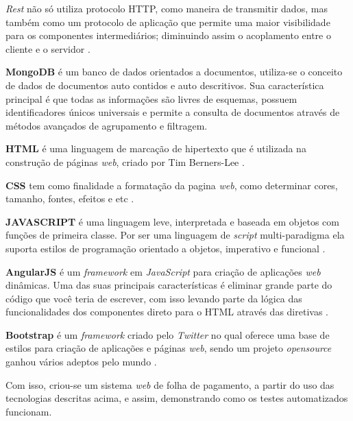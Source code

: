 \par \textit{Rest} não só utiliza protocolo HTTP, como maneira de transmitir dados, mas também como um protocolo de aplicação que permite uma maior visibilidade para os componentes intermediários; diminuindo assim o acoplamento entre o cliente e o servidor \cite{rest2}.







\textbf{MongoDB} é um banco de dados orientados a documentos, utiliza-se o conceito de dados de documentos auto contidos e auto descritivos. Sua característica principal é que todas as informações são livres de esquemas, possuem identificadores únicos universais e permite a consulta de documentos através de métodos avançados de agrupamento e filtragem. \cite{mongo}
  

\textbf{HTML} é uma linguagem de marcação de hipertexto que é utilizada na construção de páginas \textit{web}, criado por Tim Berners-Lee \cite{html}.


\textbf{CSS} tem como finalidade a formatação da pagina \textit{web}, como determinar cores, tamanho, fontes, efeitos e etc \cite{maujor}.

\textbf{JAVASCRIPT} é uma linguagem leve, interpretada e baseada em objetos com funções de primeira classe. Por ser uma linguagem de \textit{script} multi-paradigma ela suporta estilos de programação orientado a objetos, imperativo e funcional \cite{javascript}.

\textbf{AngularJS} é um \textit{framework} em \textit{JavaScript} para criação de aplicações \textit{web} dinâmicas. Uma das suas principais características é eliminar grande parte do código que você teria de escrever, com isso levando parte da lógica das funcionalidades dos componentes direto para o HTML através das diretivas \cite{angular}.

\textbf{Bootstrap} é um \textit{framework} criado pelo \textit{Twitter} no qual oferece uma base de estilos para criação de aplicações e páginas \textit{web}, sendo um projeto \textit{opensource} ganhou vários adeptos pelo mundo \cite{boostrap}.








\par Com isso, criou-se um sistema \textit{web} de folha de pagamento, a partir do uso das tecnologias descritas acima, e assim, demonstrando como os testes automatizados funcionam.




